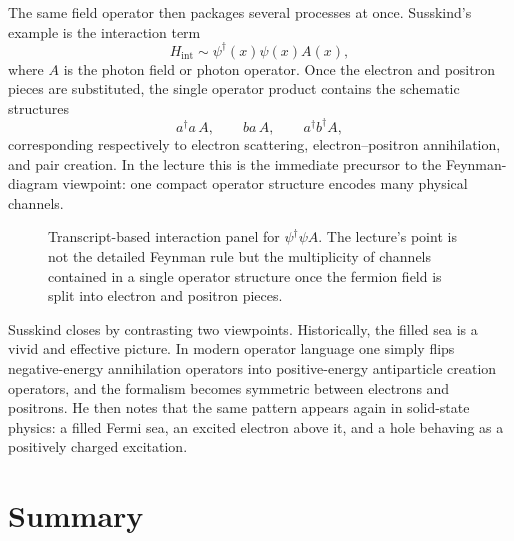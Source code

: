 The same field operator then packages several processes at once. Susskind's example is the interaction term
\begin{equation}
H_{\mathrm{int}}\sim \psi^\dagger(x)\psi(x)A(x),
\end{equation}
where \(A\) is the photon field or photon operator. Once the electron and positron pieces are substituted, the single operator product contains the schematic structures
\begin{equation}
a^\dagger a\,A,
\qquad
ba\,A,
\qquad
a^\dagger b^\dagger A,
\end{equation}
corresponding respectively to electron scattering, electron--positron annihilation, and pair creation. In the lecture this is the immediate precursor to the Feynman-diagram viewpoint: one compact operator structure encodes many physical channels.

\begin{figure}[ht]
\centering
{}
\caption{Transcript-based interaction panel for \( \psi^\dagger\psi A \). The lecture's point is not the detailed Feynman rule but the multiplicity of channels contained in a single operator structure once the fermion field is split into electron and positron pieces.}
\label{fig:aqm10-interaction}
\end{figure}

Susskind closes by contrasting two viewpoints. Historically, the filled sea is a vivid and effective picture. In modern operator language one simply flips negative-energy annihilation operators into positive-energy antiparticle creation operators, and the formalism becomes symmetric between electrons and positrons. He then notes that the same pattern appears again in solid-state physics: a filled Fermi sea, an excited electron above it, and a hole behaving as a positively charged excitation.

\section{Summary}

